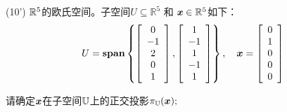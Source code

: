 \documentclass[12pt,a4paper,openany,twoside]{ctexbook}
\begin{document}
\begin{exercise}(10')
	$ \mathbb{R}^5 $的欧氏空间。子空间$U \subseteq \mathbb{R}^{5}$ 和 $\boldsymbol{\mathit{x}}  \in \mathbb{R}^{5}$如下：
	\[
	U=\mathop{\bf span}\nolimits \left\{ \left[\begin{array}{c}{0} \\ {-1} \\ {2} \\ {0} \\ {1}\end{array}\right],\left[\begin{array}{c}{1} \\ {-1} \\ {1} \\ {-1} \\ {1}\end{array}\right]
	\right\}, \quad \boldsymbol{x}=\left[\begin{array}{c}{0} \\ {1} \\ {0} \\ {0} \\ {0}\end{array}\right]
	\]
	
	请确定$ \boldsymbol{\mathit{x}}  $在子空间$ \mathbb{U} $上的正交投影$ \pi_{\mathbb{U}}(\boldsymbol{x}) ;$
	
\end{exercise}
\end{document}
